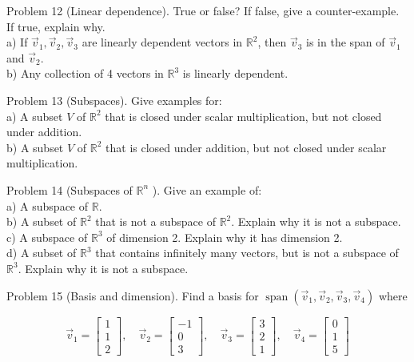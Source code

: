 \documentclass[10pt]{article}
\begin{document}
Problem 12 (Linear dependence). True or false? If false, give a counter-example. If true, explain why.\\
a) If $\vec{v}_{1}, \vec{v}_{2}, \vec{v}_{3}$ are linearly dependent vectors in $\mathbb{R}^{2}$, then $\vec{v}_{3}$ is in the span of $\vec{v}_{1}$ and $\vec{v}_{2}$.\\
b) Any collection of 4 vectors in $\mathbb{R}^{3}$ is linearly dependent.

Problem 13 (Subspaces). Give examples for:\\
a) A subset $V$ of $\mathbb{R}^{2}$ that is closed under scalar multiplication, but not closed under addition.\\
b) A subset $V$ of $\mathbb{R}^{2}$ that is closed under addition, but not closed under scalar multiplication.

Problem 14 (Subspaces of $\mathbb{R}^{n}$ ). Give an example of:\\
a) A subspace of $\mathbb{R}$.\\
b) A subset of $\mathbb{R}^{2}$ that is not a subspace of $\mathbb{R}^{2}$. Explain why it is not a subspace.\\
c) A subspace of $\mathbb{R}^{3}$ of dimension 2. Explain why it has dimension 2.\\
d) A subset of $\mathbb{R}^{3}$ that contains infinitely many vectors, but is not a subspace of $\mathbb{R}^{3}$. Explain why it is not a subspace.

Problem 15 (Basis and dimension). Find a basis for $\operatorname{span}\left(\vec{v}_{1}, \vec{v}_{2}, \vec{v}_{3}, \vec{v}_{4}\right)$ where

$$
\vec{v}_{1}=\left[\begin{array}{l}
1 \\
1 \\
2
\end{array}\right], \quad \vec{v}_{2}=\left[\begin{array}{c}
-1 \\
0 \\
3
\end{array}\right], \quad \vec{v}_{3}=\left[\begin{array}{l}
3 \\
2 \\
1
\end{array}\right], \quad \vec{v}_{4}=\left[\begin{array}{l}
0 \\
1 \\
5
\end{array}\right]
$$
\end{document}
